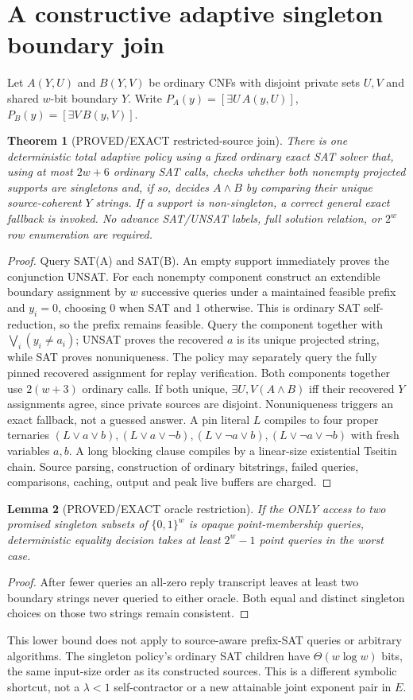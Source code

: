 \documentclass[11pt]{article}
\newtheorem{theorem}{Theorem}
\newtheorem{lemma}[theorem]{Lemma}
\begin{document}
\section{A constructive adaptive singleton boundary join}
Let $A(Y,U)$ and $B(Y,V)$ be ordinary CNFs with disjoint private sets $U,V$ and shared $w$-bit boundary $Y$. Write $P_A(y)=[\exists U\,A(y,U)]$, $P_B(y)=[\exists V\,B(y,V)]$.
\begin{theorem}[PROVED/EXACT restricted-source join]
There is one deterministic total adaptive policy using a fixed ordinary exact SAT solver that, using at most $2w+6$ ordinary SAT calls, checks whether both nonempty projected supports are singletons and, if so, decides $A\wedge B$ by comparing their unique source-coherent $Y$ strings. If a support is non-singleton, a correct general exact fallback is invoked. No advance SAT/UNSAT labels, full solution relation, or $2^w$ row enumeration are required.
\end{theorem}
\begin{proof}
Query SAT(A) and SAT(B). An empty support immediately proves the conjunction UNSAT. For each nonempty component construct an extendible boundary assignment by $w$ successive queries under a maintained feasible prefix and $y_i=0$, choosing 0 when SAT and 1 otherwise. This is ordinary SAT self-reduction, so the prefix remains feasible. Query the component together with $\bigvee_i(y_i\ne a_i)$; UNSAT proves the recovered $a$ is its unique projected string, while SAT proves nonuniqueness. The policy may separately query the fully pinned recovered assignment for replay verification. Both components together use $2(w+3)$ ordinary calls. If both unique, $\exists U,V(A\land B)$ iff their recovered $Y$ assignments agree, since private sources are disjoint. Nonuniqueness triggers an exact fallback, not a guessed answer. A pin literal $L$ compiles to four proper ternaries $(L\vee a\vee b),(L\vee a\vee\neg b),(L\vee\neg a\vee b),(L\vee\neg a\vee\neg b)$ with fresh variables $a,b$. A long blocking clause compiles by a linear-size existential Tseitin chain. Source parsing, construction of ordinary bitstrings, failed queries, comparisons, caching, output and peak live buffers are charged.
\end{proof}
\begin{lemma}[PROVED/EXACT oracle restriction]
If the ONLY access to two promised singleton subsets of $\{0,1\}^w$ is opaque point-membership queries, deterministic equality decision takes at least $2^w-1$ point queries in the worst case.
\end{lemma}
\begin{proof} After fewer queries an all-zero reply transcript leaves at least two boundary strings never queried to either oracle. Both equal and distinct singleton choices on those two strings remain consistent. \end{proof}
This lower bound does not apply to source-aware prefix-SAT queries or arbitrary algorithms. The singleton policy's ordinary SAT children have $\Theta(w\log w)$ bits, the same input-size order as its constructed sources. This is a different symbolic shortcut, not a $\lambda<1$ self-contractor or a new attainable joint exponent pair in $E$.
\end{document}
